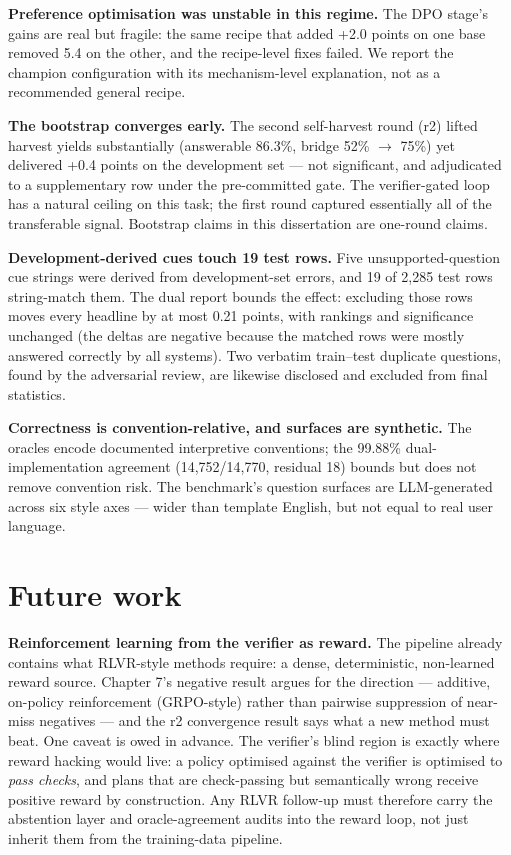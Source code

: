 \textbf{Preference optimisation was unstable in this regime.} The DPO stage's gains are real but fragile: the same recipe that added +2.0 points on one base removed 5.4 on the other, and the recipe-level fixes failed. We report the champion configuration with its mechanism-level explanation, not as a recommended general recipe.

\textbf{The bootstrap converges early.} The second self-harvest round (r2) lifted harvest yields substantially (answerable 86.3\%, bridge 52\% $\rightarrow$ 75\%) yet delivered +0.4 points on the development set --- not significant, and adjudicated to a supplementary row under the pre-committed gate. The verifier-gated loop has a natural ceiling on this task; the first round captured essentially all of the transferable signal. Bootstrap claims in this dissertation are one-round claims.

\textbf{Development-derived cues touch 19 test rows.} Five unsupported-question cue strings were derived from development-set errors, and 19 of 2,285 test rows string-match them. The dual report bounds the effect: excluding those rows moves every headline by at most 0.21 points, with rankings and significance unchanged (the deltas are negative because the matched rows were mostly answered correctly by all systems). Two verbatim train--test duplicate questions, found by the adversarial review, are likewise disclosed and excluded from final statistics.

\textbf{Correctness is convention-relative, and surfaces are synthetic.} The oracles encode documented interpretive conventions; the 99.88\% dual-implementation agreement (14,752/14,770, residual 18) bounds but does not remove convention risk. The benchmark's question surfaces are LLM-generated across six style axes --- wider than template English, but not equal to real user language.

\section{Future work}\label{sec:future-work}

\textbf{Reinforcement learning from the verifier as reward.} The pipeline already contains what RLVR-style methods require: a dense, deterministic, non-learned reward source. Chapter 7's negative result argues for the direction --- additive, on-policy reinforcement (GRPO-style) rather than pairwise suppression of near-miss negatives --- and the r2 convergence result says what a new method must beat. One caveat is owed in advance. The verifier's blind region is exactly where reward hacking would live: a policy optimised against the verifier is optimised to \emph{pass checks}, and plans that are check-passing but semantically wrong receive positive reward by construction. Any RLVR follow-up must therefore carry the abstention layer and oracle-agreement audits into the reward loop, not just inherit them from the training-data pipeline.

